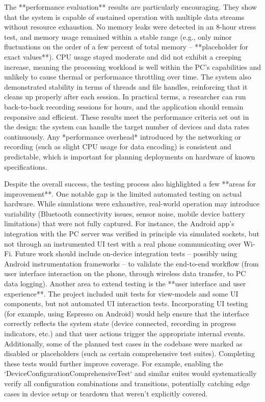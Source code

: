 \documentclass[12pt,a4paper]{article}
\begin{document}
{The **performance evaluation** results are particularly encouraging.
They show that the system is capable of sustained operation with
multiple data streams without resource exhaustion. No memory leaks were
detected in an 8-hour stress test, and memory usage remained within a
stable range (e.g., only minor fluctuations on the order of a few
percent of total memory -- **placeholder for exact values**). CPU usage
stayed moderate and did not exhibit a creeping increase, meaning the
processing workload is well within the PC's capabilities and unlikely to
cause thermal or performance throttling over time. The system also
demonstrated stability in terms of threads and file handles, reinforcing
that it cleans up properly after each session. In practical terms, a
researcher can run back-to-back recording sessions for hours, and the
application should remain responsive and efficient. These results meet
the performance criteria set out in the design: the system can handle
the target number of devices and data rates continuously. Any
*performance overhead* introduced by the networking or recording (such
as slight CPU usage for data encoding) is consistent and predictable,
which is important for planning deployments on hardware of known
specifications.

Despite the overall success, the testing process also highlighted a few
**areas for improvement**. One notable gap is the limited automated
testing on actual hardware. While simulations were exhaustive,
real-world operation may introduce variability (Bluetooth connectivity
issues, sensor noise, mobile device battery limitations) that were not
fully captured. For instance, the Android app's integration with the PC
server was verified in principle via simulated sockets, but not through
an instrumented UI test with a real phone communicating over Wi-Fi.
Future work should include on-device integration tests -- possibly using
Android instrumentation frameworks -- to validate the end-to-end
workflow (from user interface interaction on the phone, through wireless
data transfer, to PC data logging). Another area to extend testing is
the **user interface and user experience**. The project included unit
tests for view-models and some UI components, but not automated UI
interaction tests. Incorporating UI testing (for example, using Espresso
on Android) would help ensure that the interface correctly reflects the
system state (device connected, recording in progress indicators, etc.)
and that user actions trigger the appropriate internal events.
Additionally, some of the planned test cases in the codebase were marked
as disabled or placeholders (such as certain comprehensive test suites).
Completing these tests would further improve coverage. For example,
enabling the `DeviceConfigurationComprehensiveTest` and similar suites
would systematically verify all configuration combinations and
transitions, potentially catching edge cases in device setup or teardown
that weren't explicitly covered.

}
\end{document}

